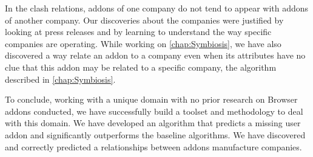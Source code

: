 \documentclass[11pt,oneside]{book}
\begin{document}
In the clash relations, addons of one company do not tend to appear with addons of another company. Our discoveries about the companies were justified by looking at press releases and by learning to understand the way specific companies are operating.
While working on \autoref{chap:Symbiosis}, we have also discovered a way relate an addon to a company even when its attributes have no clue that this addon may be related to a specific company, the algorithm described in \autoref{chap:Symbiosis}.

To conclude, working with a unique domain with no prior research on Browser addons conducted, we have successfully build a toolset and methodology to deal with this domain.
We have developed an algorithm that predicts a missing user addon and significantly outperforms the baseline algorithms.
We have discovered and correctly predicted a relationships between addons manufacture companies.



%
\iffalse
\newpage
\appendix
\chapter{} 
\renewcommand{\figurename}{Appendix}
\end{document}
